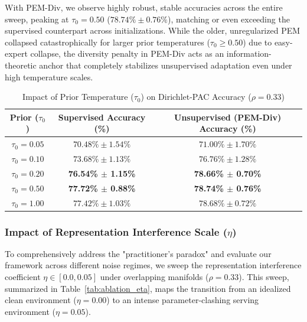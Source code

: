 With PEM-Div, we observe highly robust, stable accuracies across the entire sweep, peaking at $\tau_0 = 0.50$ ($78.74\% \pm 0.76\%$), matching or even exceeding the supervised counterpart across initializations. While the older, unregularized PEM collapsed catastrophically for larger prior temperatures ($\tau_0 \ge 0.50$) due to easy-expert collapse, the diversity penalty in PEM-Div acts as an information-theoretic anchor that completely stabilizes unsupervised adaptation even under high temperature scales.

\begin{table}[h]
\centering
\caption{Impact of Prior Temperature ($\tau_0$) on Dirichlet-PAC Accuracy ($\rho=0.33$)}
\label{tab:ablation_tau}
\vskip 0.15in
\begin{tabular}{ccc}
\toprule
\textbf{Prior ($\tau_0$)} & \textbf{Supervised Accuracy (\%)} & \textbf{Unsupervised (PEM-Div) Accuracy (\%)} \\
\midrule
$\tau_0 = 0.05$ & $70.48\% \pm 1.54\%$ & $71.00\% \pm 1.70\%$ \\
$\tau_0 = 0.10$ & $73.68\% \pm 1.13\%$ & $76.76\% \pm 1.28\%$ \\
$\tau_0 = 0.20$ & \textbf{76.54\% $\pm$ 1.15\%} & \textbf{78.66\% $\pm$ 0.70\%} \\
$\tau_0 = 0.50$ & \textbf{77.72\% $\pm$ 0.88\%} & \textbf{78.74\% $\pm$ 0.76\%} \\
$\tau_0 = 1.00$ & $77.42\% \pm 1.03\%$ & $78.68\% \pm 0.72\%$ \\
\bottomrule
\end{tabular}
\end{table}

\subsubsection{Impact of Representation Interference Scale ($\eta$)}
To comprehensively address the "practitioner's paradox" and evaluate our framework across different noise regimes, we sweep the representation interference coefficient $\eta \in [0.0, 0.05]$ under overlapping manifolds ($\rho = 0.33$). This sweep, summarized in Table~\ref{tab:ablation_eta}, maps the transition from an idealized clean environment ($\eta=0.00$) to an intense parameter-clashing serving environment ($\eta=0.05$).

